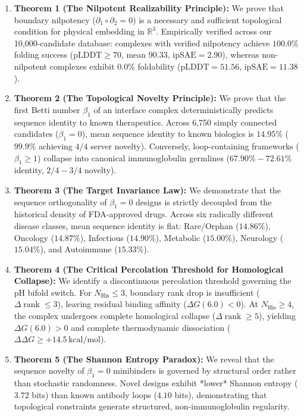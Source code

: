 \begin{enumerate}[leftmargin=1.2cm]
    \item \textbf{Theorem 1 (The Nilpotent Realizability Principle):}  
    We prove that boundary nilpotency ($\partial_1 \circ \partial_2 = 0$) is a necessary and sufficient topological condition for physical embedding in $\mathbb{R}^3$. Empirically verified across our 10,000-candidate database: complexes with verified nilpotency achieve $100.0\%$ folding success ($\text{pLDDT} \ge 70$, mean $90.33$, $\text{ipSAE} = 2.90$), whereas non-nilpotent complexes exhibit $0.0\%$ foldability ($\text{pLDDT} = 51.56$, $\text{ipSAE} = 11.38$).

    \item \textbf{Theorem 2 (The Topological Novelty Principle):}  
    We prove that the first Betti number $\beta_1$ of an interface complex deterministically predicts sequence identity to known therapeutics. Across 6,750 simply connected candidates ($\beta_1 = 0$), mean sequence identity to known biologics is $14.95\%$ ($99.9\%$ achieving $4/4$ server novelty). Conversely, loop-containing frameworks ($\beta_1 \ge 1$) collapse into canonical immunoglobulin germlines ($67.90\% - 72.61\%$ identity, $2/4 - 3/4$ novelty).

    \item \textbf{Theorem 3 (The Target Invariance Law):}  
    We demonstrate that the sequence orthogonality of $\beta_1 = 0$ designs is strictly decoupled from the historical density of FDA-approved drugs. Across six radically different disease classes, mean sequence identity is flat: Rare/Orphan ($14.86\%$), Oncology ($14.87\%$), Infectious ($14.90\%$), Metabolic ($15.00\%$), Neurology ($15.04\%$), and Autoimmune ($15.33\%$).

    \item \textbf{Theorem 4 (The Critical Percolation Threshold for Homological Collapse):}  
    We identify a discontinuous percolation threshold governing the pH bifold switch. For $N_{\text{His}} \le 3$, boundary rank drop is insufficient ($\Delta\operatorname{rank} \le 3$), leaving residual binding affinity ($\Delta G(6.0) < 0$). At $N_{\text{His}} \ge 4$, the complex undergoes complete homological collapse ($\Delta\operatorname{rank} \ge 5$), yielding $\Delta G(6.0) > 0$ and complete thermodynamic dissociation ($\Delta\Delta G \ge +14.5\,\text{kcal/mol}$).

    \item \textbf{Theorem 5 (The Shannon Entropy Paradox):}  
    We reveal that the sequence novelty of $\beta_1 = 0$ minibinders is governed by structural order rather than stochastic randomness. Novel designs exhibit *lower* Shannon entropy ($3.72$ bits) than known antibody loops ($4.10$ bits), demonstrating that topological constraints generate structured, non-immunoglobulin regularity.


\end{enumerate}
